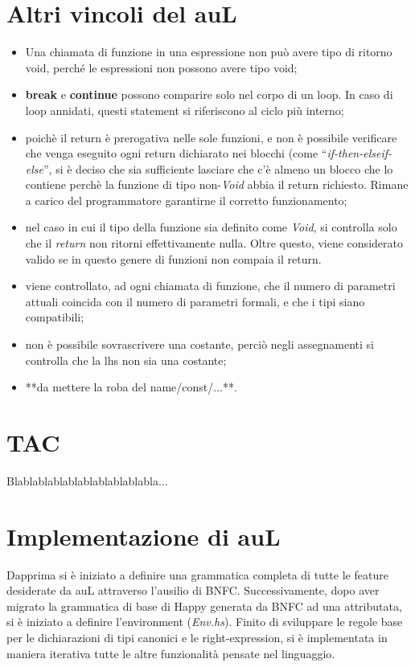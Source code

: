 \documentclass{article}
\begin{document}
\section{Altri vincoli del auL}
\begin{itemize}
	\item Una chiamata di funzione in una espressione non può avere tipo di
		ritorno void, perché le espressioni non possono avere tipo void;
	
	\item \textbf{break} e \textbf{continue} possono comparire solo nel corpo di un loop.
		In caso di loop annidati, questi statement si riferiscono al ciclo più interno;
	
	\item poichè il return è prerogativa nelle sole funzioni, e non è possibile verificare che
		venga eseguito ogni return dichiarato nei blocchi (come ``\textit{if-then-elseif-else}'',
		si è deciso che sia sufficiente lasciare che c'è almeno un blocco che lo contiene perchè
		la funzione di tipo non-\textit{Void} abbia il return richiesto. Rimane a carico del programmatore
		garantirne il corretto funzionamento;

	\item nel caso in cui il tipo della funzione sia definito come \textit{Void}, si controlla solo che
		il \textit{return} non ritorni effettivamente nulla. Oltre questo, viene considerato valido se
		in questo genere di funzioni non compaia il return.
	
	\item viene controllato, ad ogni chiamata di funzione, che il numero di parametri
		attuali coincida con il numero di parametri formali, e che i tipi
		siano compatibili;
		
	\item non è possibile sovrascrivere una costante, perciò negli assegnamenti
		si controlla che la lhs non sia una costante;
	
	\item **da mettere la roba del name/const/...**.
\end{itemize}


\section{TAC}
Blablablablablablablablablabla...

\section{Implementazione di auL}
Dapprima si è iniziato a definire una grammatica completa di tutte le feature desiderate da auL attraverso l'ausilio di
BNFC. Successivamente, dopo aver migrato la grammatica di base di Happy generata da BNFC ad una attributata,
si è iniziato a definire l'environment (\textit{Env.hs}). Finito di sviluppare le regole base per le dichiarazioni 
di tipi canonici e le right-expression, si è implementata in maniera iterativa tutte le altre funzionalità pensate 
nel linguaggio.
\end{document}
